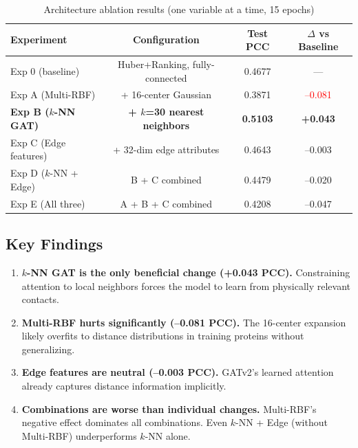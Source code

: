\begin{table}[h]
\centering
\caption{Architecture ablation results (one variable at a time, 15 epochs)}
\label{tab:arch_ablation}
\begin{tabular}{lccc}
\toprule
\textbf{Experiment} & \textbf{Configuration} & \textbf{Test PCC} & \textbf{$\Delta$ vs Baseline} \\
\midrule
Exp 0 (baseline) & Huber+Ranking, fully-connected & 0.4677 & --- \\
Exp A (Multi-RBF) & + 16-center Gaussian & 0.3871 & \textcolor{red}{--0.081} \\
\textbf{Exp B ($k$-NN GAT)} & \textbf{+ $k$=30 nearest neighbors} & \textbf{0.5103} & \textcolor{green!50!black}{\textbf{+0.043}} \\
Exp C (Edge features) & + 32-dim edge attributes & 0.4643 & --0.003 \\
Exp D ($k$-NN + Edge) & B + C combined & 0.4479 & --0.020 \\
Exp E (All three) & A + B + C combined & 0.4208 & --0.047 \\
\bottomrule
\end{tabular}
\end{table}

\subsection{Key Findings}

\begin{enumerate}
    \item \textbf{$k$-NN GAT is the only beneficial change (+0.043 PCC).} Constraining attention to local neighbors forces the model to learn from physically relevant contacts.

    \item \textbf{Multi-RBF hurts significantly (--0.081 PCC).} The 16-center expansion likely overfits to distance distributions in training proteins without generalizing.

    \item \textbf{Edge features are neutral (--0.003 PCC).} GATv2's learned attention already captures distance information implicitly.

    \item \textbf{Combinations are worse than individual changes.} Multi-RBF's negative effect dominates all combinations. Even $k$-NN + Edge (without Multi-RBF) underperforms $k$-NN alone.
\end{enumerate}


